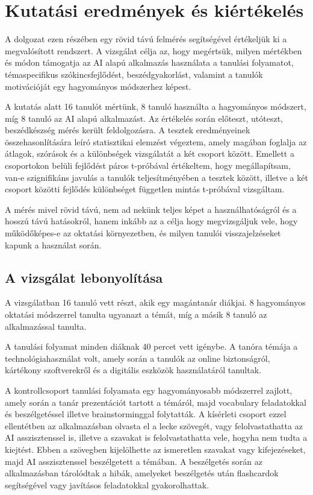 \chapter{Kutatási eredmények és kiértékelés}

A dolgozat ezen részében egy rövid távú felmérés segítségével értékeljük ki a megvalósított rendszert. A vizsgálat célja az, hogy megértsük, milyen mértékben és módon támogatja az AI alapú alkalmazás használata a tanulási folyamatot, témaspecifikus szókincsfejlődést, beszédgyakorlást, valamint a tanulók motivációját egy hagyományos módszerhez képest.

A kutatás alatt 16 tanulót mértünk, 8 tanuló használta a hagyományos módszert, míg 8 tanuló az AI alapú alkalmazást. Az értékelés során előteszt, utóteszt, beszédkészség mérés került feldolgozásra. A tesztek eredményeinek összehasonlítására leíró statisztikai elemzést végeztem, amely magában foglalja az átlagok, szórások és a különbségek vizsgálatát a két csoport között. Emellett a csoportokon belüli fejlődést páros t-próbával értékeltem, hogy megállapítsam, van-e szignifikáns javulás a tanulók teljesítményében a tesztek között, illetve a két csoport közötti fejlődés különbséget független mintás t-próbával vizsgáltam.

A mérés mivel rövid távú, nem ad nekünk teljes képet a használhatóságról és a hosszú távú hatásokról, hanem inkább az a célja hogy megvizsgáljuk vele, hogy működőképes-e az oktatási környezetben, és milyen tanulói visszajelzéseket kapunk a használat során.

\section{A vizsgálat lebonyolítása}

A vizsgálatban 16 tanuló vett részt, akik egy magántanár diákjai. 8 hagyományos oktatási módszerrel tanulta ugyanazt a témát, míg a másik 8 tanuló az alkalmazással tanulta.

A tanulási folyamat minden diáknak 40 percet vett igénybe. A tanóra témája a technológiahasználat volt, amely során a tanulók az online biztonságról, kártékony szoftverekről és a digitális eszközök használatáról tanultak.

A kontrollcsoport tanulási folyamata egy hagyományosabb módszerrel zajlott, amely során a tanár prezentációt tartott a témáról, majd vocabulary feladatokkal és beszélgetéssel illetve brainstorminggal folytatták. A kísérleti csoport ezzel ellentétben az alkalmazásban olvasta el a lecke szövegét, vagy felolvastathatta az AI asszisztenssel is, illetve a szavakat is felolvastathatta vele, hogyha nem tudta a kiejtést. Ebben a szövegben kijelölhette az ismeretlen szavakat vagy kifejezéseket, majd AI asszisztenssel beszélgetett a témában. A beszélgetés során az alkalmazásban tárolódtak a hibák, amelyeket beszélgetés után flashcardok segítségével vagy javításos feladatokkal gyakorolhattak.

